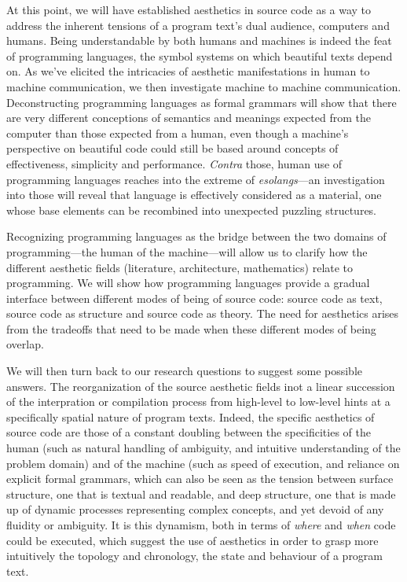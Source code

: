At this point, we will have established aesthetics in source code as a way to address the inherent tensions of a program text's dual audience, computers and humans. Being understandable by both humans and machines is indeed the feat of programming languages, the symbol systems on which beautiful texts depend on. As we've elicited the intricacies of aesthetic manifestations in human to machine communication, we then investigate machine to machine communication. Deconstructing programming languages as formal grammars will show that there are very different conceptions of semantics and meanings expected from the computer than those expected from a human, even though a machine's perspective on beautiful code could still be based around concepts of effectiveness, simplicity and performance. \emph{Contra} those, human use of programming languages reaches into the extreme of \emph{esolangs}—an investigation into those will reveal that language is effectively considered as a material, one whose base elements can be recombined into unexpected puzzling structures.

Recognizing programming languages as the bridge between the two domains of programming—the human of the machine—will allow us to clarify how the different aesthetic fields (literature, architecture, mathematics) relate to programming. We will show how programming languages provide a gradual interface between different modes of being of source code: source code as text, source code as structure and source code as theory. The need for aesthetics arises from the tradeoffs that need to be made when these different modes of being overlap\cite{simondon_du_1958}.

We will then turn back to our research questions to suggest some possible answers. The reorganization of the source aesthetic fields inot a linear succession of the interpration or compilation process from high-level to low-level hints at a specifically spatial nature of program texts. Indeed, the specific aesthetics of source code are those of a constant doubling between the specificities of the human (such as natural handling of ambiguity, and intuitive understanding of the problem domain) and of the machine (such as speed of execution, and reliance on explicit formal grammars, which can also be seen as the tension between surface structure, one that is textual and readable, and deep structure, one that is made up of dynamic processes representing complex concepts, and yet devoid of any fluidity or ambiguity. It is this dynamism, both in terms of \emph{where} and \emph{when} code could be executed, which suggest the use of aesthetics in order to grasp more intuitively the topology and chronology, the state and behaviour of a program text.

